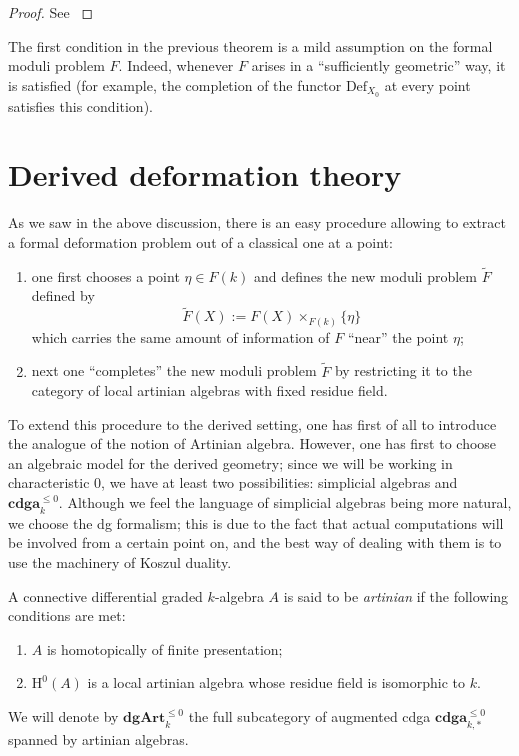 \begin{refsection}
\begin{proof}
See \cite[Theorem 2.3.2]{sernesi}
\end{proof}

The first condition in the previous theorem is a mild assumption on the formal moduli problem $F$. Indeed, whenever $F$ arises in a ``sufficiently geometric'' way, it is satisfied (for example, the completion of the functor $\mathrm{Def}_{X_0}$ at every point satisfies this condition).

\section{Derived deformation theory}

As we saw in the above discussion, there is an easy procedure allowing to extract a formal deformation problem out of a classical one at a point:
\begin{enumerate}
\item one first chooses a point $\eta \in F(k)$ and defines the new moduli problem $\widetilde{F}$ defined by
\[
\widetilde{F}(X) := F(X) \times_{F(k)} \{\eta\}
\]
which carries the same amount of information of $F$ ``near'' the point $\eta$;
\item next one ``completes'' the new moduli problem $\widetilde{F}$ by restricting it to the category of local artinian algebras with fixed residue field.
\end{enumerate}

To extend this procedure to the derived setting, one has first of all to introduce the analogue of the notion of Artinian algebra. However, one has first to choose an algebraic model for the derived geometry; since we will be working in characteristic $0$, we have at least two possibilities: simplicial algebras and $\mathbf{cdga}_k^{\le 0}$. Although we feel the language of simplicial algebras being more natural, we choose the dg formalism; this is due to the fact that actual computations will be involved from a certain point on, and the best way of dealing with them is to use the machinery of Koszul duality.

\begin{defin}
A connective differential graded $k$-algebra $A$ is said to be \emph{artinian} if the following conditions are met:
\begin{enumerate}
\item $A$ is homotopically of finite presentation;

\item $\mathrm{H}^0(A)$ is a local artinian algebra whose residue field is isomorphic to $k$.
\end{enumerate}
We will denote by $\mathbf{dgArt}_k^{\le 0}$ the full subcategory of augmented cdga $\mathbf{cdga}_{k,*}^{\le 0}$ spanned by artinian algebras.
\end{defin}


\end{refsection}
